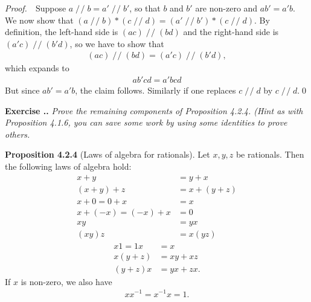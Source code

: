 \documentclass{book}
\DeclareMathOperator{\tby}{/\!/}%
\newcommand{\pff}{\vspace{.25em}\noindent\emph{Proof.}~~}
\newcommand{\titl}[1]{\noindent\textbf{#1}}
\newcounter{Exercise}[section]
\renewcommand{\theExercise}{\thesection.\arabic{Exercise}.}
\newcommand{\new}{\vspace{1.5em}\noindent\textbf{{Exercise \stepcounter{Exercise}\textbf{\theExercise}}} }
\begin{document}
\pff Suppose $a\tby b=a'\tby b'$, so that $b$ and $b'$ are non-zero and $ab'=a'b$. We now show that $(a\tby b)*(c\tby d)=(a'\tby b')*(c\tby d)$. By definition, the left-hand side is $(ac)\tby(bd)$ and the right-hand side is $(a'c)\tby(b'd)$, so we have to show that
   \begin{align*}
      (ac)\tby(bd)=(a'c)\tby(b'd),
   \end{align*}
which expands to
   \begin{align*}
      ab' cd=a'b cd
   \end{align*}
But since $ab'=a'b$, the claim follows. Similarly if one replaces $c\tby d$ by $c\tby d$.\qed

\new\emph{Prove the remaining components of Proposition 4.2.4. (Hint as with Proposition 4.1.6, you can save some work by using some identities to prove others.}

\begin{framed}
\titl{Proposition 4.2.4} (Laws of algebra for rationals). Let $x,y,z$ be rationals. Then the following laws of algebra hold:
    \begin{align*}
        x+y&=y+x\\
        (x+y)+z&=x+(y+z)\\
        x+0=0+x&=x\\
        x+(-x)=(-x)+x&=0\\
        xy&=yx\\
        (xy)z&=x(yz)
    \end{align*}
    \begin{align*}
        x1=1x&=x\\
        x(y+z)&=xy+xz\\
        (y+z)x&=yx+zx.
    \end{align*}
If $x$ is non-zero, we also have
    \begin{align*}
        xx^{-1}=x^{-1}x=1.
    \end{align*}
\end{framed}
\end{document}
